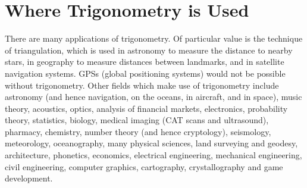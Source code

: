             \section{ Where Trigonometry is Used}
            \nopagebreak
      \label{m39405*id78100}There are many applications of trigonometry. Of particular value is the technique of triangulation, which is used in astronomy to measure the distance to nearby stars, in geography to measure distances between landmarks, and in satellite navigation systems. GPSs (global positioning systems) would not be possible without trigonometry. Other fields which make use of trigonometry include astronomy (and hence navigation, on the oceans, in aircraft, and in space), music theory, acoustics, optics, analysis of financial markets, electronics, probability theory, statistics, biology, medical imaging (CAT scans and ultrasound), pharmacy, chemistry, number theory (and hence cryptology), seismology, meteorology, oceanography, many physical sciences, land surveying and geodesy, architecture, phonetics, economics, electrical engineering, mechanical engineering, civil engineering, computer graphics, cartography, crystallography and game development.\par 
%             
    \label{m39405*cid4}
